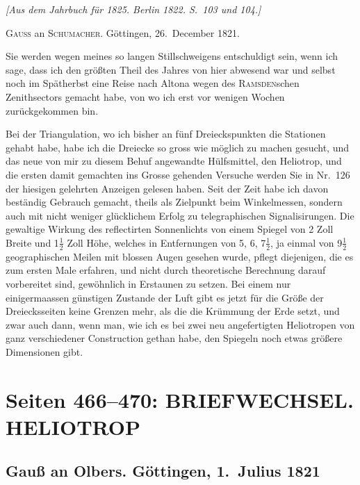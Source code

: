 \documentclass[12pt,a4paper]{article}
\theoremstyle{plain}
\theoremstyle{definition}
\theoremstyle{remark}
\begin{document}
\noindent
\textit{[Aus dem Jahrbuch f\"ur 1825. Berlin 1822. S.~103 und 104.]}

\medskip

\noindent
\textsc{Gau\ss{}} an \textsc{Schumacher}. G\"ottingen, 26.\ December 1821.

\smallskip

Sie werden wegen meines so langen Stillschweigens entschuldigt sein, wenn ich sage, dass ich den gr\"o\ss ten Theil des Jahres von hier abwesend war und selbst noch im Sp\"atherbst eine Reise nach Altona wegen des \textsc{Ramsden}schen Zenithsectors gemacht habe, von wo ich erst vor wenigen Wochen zur\"uckgekommen bin.

Bei der Triangulation, wo ich bisher an f\"unf Dreieckspunkten die Stationen gehabt habe, habe ich die Dreiecke so gross wie m\"oglich zu machen gesucht, und das neue von mir zu diesem Behuf angewandte H\"ulfsmittel, den Heliotrop, und die ersten damit gemachten ins Grosse gehenden Versuche werden Sie in Nr.\ 126 der hiesigen gelehrten Anzeigen gelesen haben. Seit der Zeit habe ich davon best\"andig Gebrauch gemacht, theils als Zielpunkt beim Winkelmessen, sondern auch mit nicht weniger gl\"ucklichem Erfolg zu telegraphischen Signalisirungen. Die gewaltige Wirkung des reflectirten Sonnenlichts von einem Spiegel von 2 Zoll Breite und 1$\tfrac12$ Zoll H\"ohe, welches in Entfernungen von 5, 6, 7$\tfrac12$, ja einmal von 9$\tfrac12$ geographischen Meilen mit blossen Augen gesehen wurde, pflegt diejenigen, die es zum ersten Male erfahren, und nicht durch theoretische Berechnung darauf vorbereitet sind, gew\"ohnlich in Erstaunen zu setzen. Bei einem nur einigermaassen g\"unstigen Zustande der Luft gibt es jetzt f\"ur die Gr\"o\ss e der Dreiecksseiten keine Grenzen mehr, als die die Kr\"ummung der Erde setzt, und zwar auch dann, wenn man, wie ich es bei zwei neu angefertigten Heliotropen von ganz verschiedener Construction gethan habe, den Spiegeln noch etwas gr\"o\ss ere Dimensionen gibt.

\vfill
\eject


\section*{Seiten 466--470: BRIEFWECHSEL. HELIOTROP}

\subsection*{Gau\ss{} an Olbers. G\"ottingen, 1.\ Julius 1821}
\end{document}
